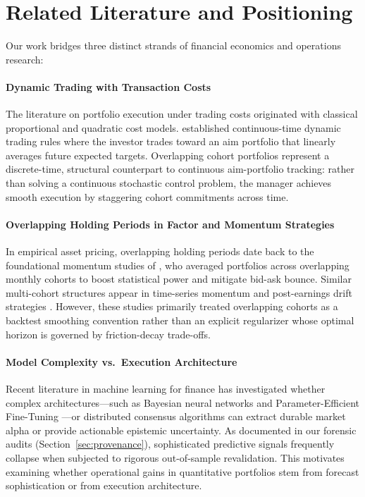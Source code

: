 \documentclass[11pt,a4paper]{article}
\theoremstyle{definition}
\begin{document}
\section{Related Literature and Positioning}
\label{sec:literature}

Our work bridges three distinct strands of financial economics and operations research:

\paragraph{Dynamic Trading with Transaction Costs}
The literature on portfolio execution under trading costs originated with classical proportional and quadratic cost models. \citet{garleanu2013dynamic} established continuous-time dynamic trading rules where the investor trades toward an aim portfolio that linearly averages future expected targets. Overlapping cohort portfolios represent a discrete-time, structural counterpart to continuous aim-portfolio tracking: rather than solving a continuous stochastic control problem, the manager achieves smooth execution by staggering cohort commitments across time.

\paragraph{Overlapping Holding Periods in Factor and Momentum Strategies}
In empirical asset pricing, overlapping holding periods date back to the foundational momentum studies of \citet{jegadeesh1993returns}, who averaged portfolios across overlapping monthly cohorts to boost statistical power and mitigate bid-ask bounce. Similar multi-cohort structures appear in time-series momentum \citep{moskowitz2012time} and post-earnings drift strategies \citep{bernard1989post}. However, these studies primarily treated overlapping cohorts as a backtest smoothing convention rather than an explicit regularizer whose optimal horizon is governed by friction-decay trade-offs.

\paragraph{Model Complexity vs.\ Execution Architecture}
Recent literature in machine learning for finance has investigated whether complex architectures---such as Bayesian neural networks and Parameter-Efficient Fine-Tuning \citep{blundell2015weight, hu2022lora}---or distributed consensus algorithms \citep{papastaikoudis2025distributed} can extract durable market alpha or provide actionable epistemic uncertainty. As documented in our forensic audits (Section~\ref{sec:provenance}), sophisticated predictive signals frequently collapse when subjected to rigorous out-of-sample revalidation. This motivates examining whether operational gains in quantitative portfolios stem from forecast sophistication or from execution architecture.
\end{document}
